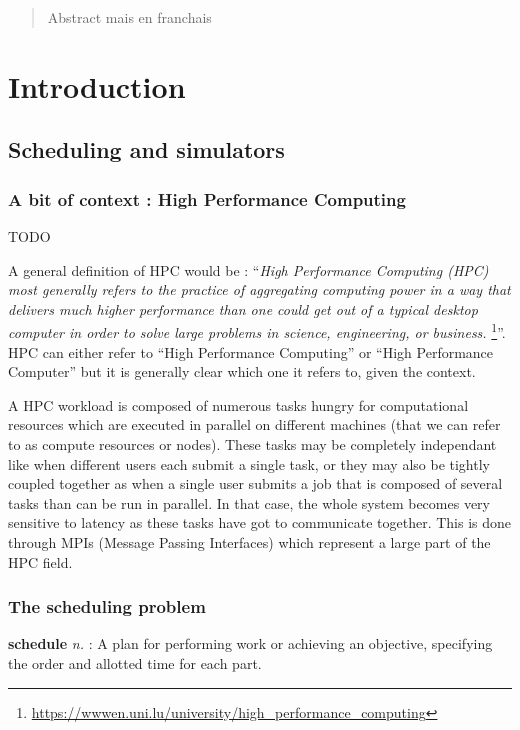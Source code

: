 \documentclass[12pt, a4paper]{memoir}
\begin{document}
\renewcommand\abstractname{R\'esum\'e}
\begin{abstract} 
	Abstract mais en franchais
\end{abstract}

\tableofcontents* %
\normalsize

\mainmatter
\SingleSpace

\chapter{Introduction}
\section{Scheduling and simulators}
\subsection{A bit of context : High Performance Computing}

TODO

A general definition of HPC would be :
``\textit{High Performance Computing (HPC) most generally refers to the
		practice of aggregating computing power in a way that delivers
		much higher performance than one could get out of a typical
		desktop computer in order to solve large problems in science,
		engineering, or
		business.}
\footnote{\url{https://wwwen.uni.lu/university/high_performance_computing}}''.
HPC can either refer to ``High Performance Computing'' or ``High Performance
Computer'' but it is generally clear which one it refers to, given the
context.

A HPC workload is composed of numerous tasks hungry for computational resources
which are executed in parallel on different machines (that we can refer to as
compute resources or nodes). These tasks may be completely independant like
when different users each submit a single task, or they may also be tightly
coupled together as when a single user submits a job that is composed of
several tasks than can be run in parallel. In that case, the whole system
becomes very sensitive to latency as these tasks have got to communicate
together. This is done through MPIs (Message Passing Interfaces) which
represent a large part of the HPC field.\\

\subsection{The scheduling problem}
\begin{displayquote}[][]
	\textbf{schedule} \textit{n.} : A plan for
	performing work or achieving an objective, specifying the order and
	allotted time for each part.
\end{displayquote}
\end{document}

